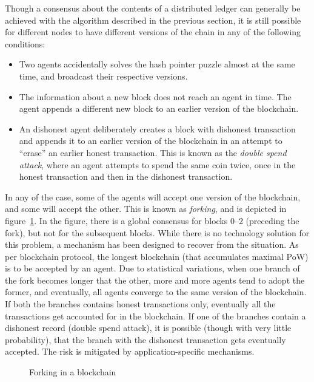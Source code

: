 Though a consensus about the contents of a distributed ledger can generally be achieved with the algorithm described in the previous
section, it is still possible for different nodes to have different versions of the chain in any of the following conditions:

\begin{itemize}
	\item Two agents accidentally solves the hash pointer puzzle almost at the same time, and broadcast their respective
		versions. 
	\item The information about a new block does not reach an agent in time. The agent appends a different new block to an 
		earlier version of the blockchain. 
	\item An dishonest agent deliberately creates a block with dishonest transaction and appends it to an earlier version
		of the blockchain in an attempt to ``erase'' an earlier honest transaction. This is known as the {\em double spend
		attack}, where an agent attempts to spend the same coin twice, once in the honest transaction and then in the
		dishonest transaction.
\end{itemize}

In any of the case, some of the agents will accept one version of the blockchain, and some will accept the other. This is known as 
{\em forking}, and is depicted in figure~\ref{fig:ledger:fork}. In the figure, there is a global consensus for  blocks 0--2 
(preceding the fork), but not for the subsequent blocks. While there is no technology solution for this problem, a mechanism has been 
designed to recover from the situation. As per blockchain protocol, the longest blockchain (that accumulates maximal PoW) is to be 
accepted by an agent. Due to statistical variations, when one branch of the fork becomes longer that the other, more and more agents 
tend to adopt the former, and eventually, all agents converge to the same version of the blockchain. If both the branches contains 
honest transactions only, eventually all the transactions get accounted for in the blockchain. If one of the branches contain a 
dishonest record (double spend attack), it is possible (though with very little probability), that the branch with the dishonest 
transaction gets eventually accepted. The risk is mitigated by application-specific mechanisms. 

\begin{figure}[!htbp]
	\centerline{
	}
	\caption{Forking in a blockchain}
	\label{fig:ledger:fork}
\end{figure}

